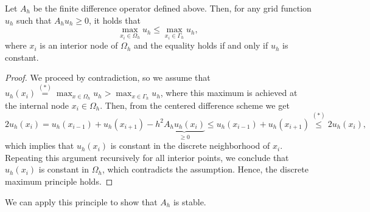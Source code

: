 \begin{theorem}
    Let $A_h$ be the finite difference operator defined above. Then, for any grid function $u_h$ such that $A_h u_h \geq 0$, it holds that
    \begin{equation}
        \max_{x_i\in \Omega_h} u_h \leq \max_{x_i\in \Gamma_h} u_h,
    \end{equation}
    where $x_i$ is an interior node of $\Omega_h$ and the equality holds if and only if $u_h$ is constant.
    \begin{proof}
        We proceed by contradiction, so we assume that $u_h(x_i) \overset{(*)}{=} \max_{x\in \Omega_h} u_h > \max_{x\in \Gamma_h} u_h$, where this maximum is achieved at the internal node $x_i\in \Omega_h$. Then, from the centered difference scheme we get
        \begin{equation*}
            2u_h(x_i) = u_h(x_{i-1}) + u_h(x_{i+1}) - h^2 \underbrace{A_h u_h(x_i)}_{\geq 0} \leq u_h(x_{i-1}) + u_h(x_{i+1}) \overset{(*)}{\leq} 2u_h(x_i),
        \end{equation*}
        which implies that $u_h(x_i)$ is constant in the discrete neighborhood of $x_i$. Repeating this argument recursively for all interior points, we conclude that $u_h(x_i)$ is constant in $\Omega_h$, which contradicts the assumption. Hence, the discrete maximum principle holds.
    \end{proof}
\end{theorem}
We can apply this principle to show that $A_h$ is stable. 
